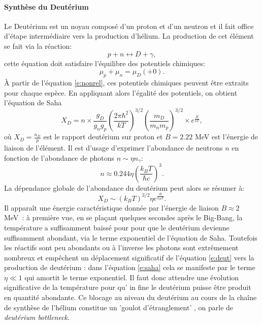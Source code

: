 \paragraph{Synthèse du Deutérium}
Le Deutérium est un noyau composé d'un proton et d'un neutron  et il fait office d'étape intermédiaire vers la production d'hélium. La production de cet élément se fait via la réaction:
\begin{equation}
p+n\leftrightarrow D+\gamma ,
\label{e:deut}
\end{equation}
cette équation doit satisfaire l'équilibre des potentiels chimiques:
\begin{equation}
\mu_p +\mu_n =\mu_D (+0).
\end{equation}
À partir de l'équation \ref{e:nonrel}, ces potentiels chimiques peuvent être extraits pour chaque espèce. En appliquant alors l'égalité des potentiels, on obtient l'équation de Saha
\begin{equation}
X_D=n \times \frac{g_D}{g_n g_p} \left(\frac{2\pi \hbar^2}{kT}\right)^{3/2}\left(\frac{m_D}{m_n m_p}\right)^{3/2} \times e^{\frac{B}{kT}},
\end{equation}
où $X_D=\frac{n_D}{p}$ est le rapport deutérium sur proton et $B=2.22$ MeV est l'énergie de liaison de l'élément. Il est d'usage d'exprimer l'abondance de neutrons $n$ en fonction de l'abondance de photons $n\sim \eta n_\gamma$:
\begin{equation}
n\approx 0.244 \eta \left(\frac{k_BT}{\hbar c}\right)^3.
\end{equation}
La dépendance globale de l'abondance du deutérium peut alors se résumer à:
\begin{equation}
X_D\sim(k_BT)^{3/2}\eta e^{\frac{B}{k_B T}}.
\label{e:saha}
\end{equation}
Il apparaît une énergie caractéristique donnée par l'énergie de liaison $B\approx 2$ MeV~: à première vue, en se plaçant quelques secondes après le Big-Bang, la température a suffisamment baissé pour pour que le deutérium devienne suffisamment abondant, via le terme exponentiel de l'équation de Saha. Toutefois les réactifs sont peu abondants ou à l'inverse les photons sont extrêmement nombreux et empêchent un déplacement significatif de l'équation \ref{e:deut} vers la production de deutérium : dans l'équation \ref{e:saha} cela se manifeste par le terme $\eta \ll 1$ qui amortit le terme exponentiel. Il faut donc attendre une évolution significative de la température pour qu’ in fine le deutérium puisse être produit en quantité abondante. Ce blocage au niveau du deutérium au cours de la chaîne de synthèse de l'hélium constitue un 'goulot d'étranglement' , on parle de \textit{deutérium bottleneck}.


